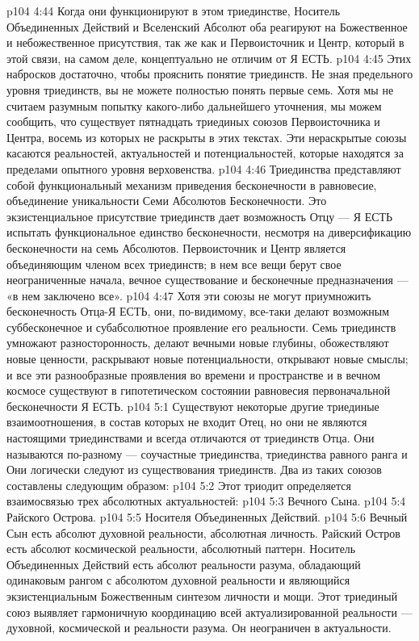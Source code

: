 \vs p104 4:44 Когда они функционируют в этом триединстве, Носитель Объединенных Действий и Вселенский Абсолют оба реагируют на Божественное и небожественное присутствия, так же как и Первоисточник и Центр, который в этой связи, на самом деле, концептуально не отличим от Я ЕСТЬ.
\vs p104 4:45 \pc Этих набросков достаточно, чтобы прояснить понятие триединств. Не зная предельного уровня триединств, вы не можете полностью понять первые семь. Хотя мы не считаем разумным попытку какого\hyp{}либо дальнейшего уточнения, мы можем сообщить, что существует пятнадцать триединых союзов Первоисточника и Центра, восемь из которых не раскрыты в этих текстах. Эти нераскрытые союзы касаются реальностей, актуальностей и потенциальностей, которые находятся за пределами опытного уровня верховенства.
\vs p104 4:46 Триединства представляют собой функциональный механизм приведения бесконечности в равновесие, объединение уникальности Семи Абсолютов Бесконечности. Это экзистенциальное присутствие триединств дает возможность Отцу --- Я ЕСТЬ испытать функциональное единство бесконечности, несмотря на диверсификацию бесконечности на семь Абсолютов. Первоисточник и Центр является объединяющим членом всех триединств; в нем все вещи берут свое неограниченные начала, вечное существование и бесконечные предназначения --- «в нем заключено все».
\vs p104 4:47 Хотя эти союзы не могут приумножить бесконечность Отца\hyp{}Я ЕСТЬ, они, по\hyp{}видимому, все\hyp{}таки делают возможным суббесконечное и субабсолютное проявление его реальности. Семь триединств умножают разносторонность, делают вечными новые глубины, обожествляют новые ценности, раскрывают новые потенциальности, открывают новые смыслы; и все эти разнообразные проявления во времени и пространстве и в вечном космосе существуют в гипотетическом состоянии равновесия первоначальной бесконечности Я ЕСТЬ.
\vs p104 5:1 Существуют некоторые другие триединые взаимоотношения, в состав которых не входит Отец, но они не являются настоящими триединствами и всегда отличаются от триединств Отца. Они называются по\hyp{}разному --- соучастные триединства, триединства равного ранга и  Они логически следуют из существования триединств. Два из таких союзов составлены следующим образом:
\vs p104 5:2  Этот триодит определяется взаимосвязью трех абсолютных актуальностей:
\vs p104 5:3 \bibnobreakspace Вечного Сына.
\vs p104 5:4 \bibnobreakspace Райского Острова.
\vs p104 5:5 \bibnobreakspace Носителя Объединенных Действий.
\vs p104 5:6 \pc Вечный Сын есть абсолют духовной реальности, абсолютная личность. Райский Остров есть абсолют космической реальности, абсолютный паттерн. Носитель Объединенных Действий есть абсолют реальности разума, обладающий одинаковым рангом с абсолютом духовной реальности и являющийся экзистенциальным Божественным синтезом личности и мощи. Этот триединый союз выявляет гармоничную координацию всей актуализированной реальности --- духовной, космической и реальности разума. Он неограничен в актуальности.
